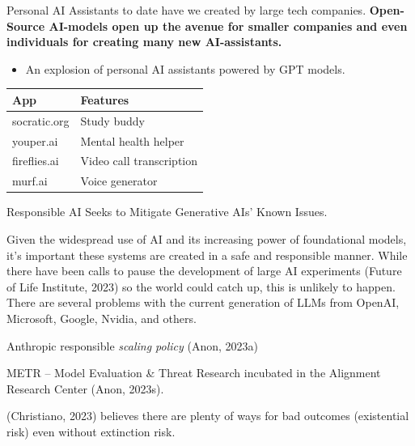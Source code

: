 \documentclass[
  letterpaper,
  DIV=11,
  numbers=noendperiod]{scrartcl}
\providecommand{\tightlist}{%
  \setlength{\itemsep}{0pt}\setlength{\parskip}{0pt}}\usepackage{longtable,booktabs,array}
\begin{document}
Personal AI Assistants to date have we created by large tech companies.
\textbf{Open-Source AI-models open up the avenue for smaller companies
and even individuals for creating many new AI-assistants.}

\begin{itemize}
\tightlist
\item
  An explosion of personal AI assistants powered by GPT models.
\end{itemize}

\begin{longtable}[]{@{}ll@{}}
\toprule\noalign{}
App & Features \\
\midrule\noalign{}
\endhead
\bottomrule\noalign{}
\endlastfoot
socratic.org & Study buddy \\
youper.ai & Mental health helper \\
fireflies.ai & Video call transcription \\
murf.ai & Voice generator \\
\end{longtable}

Responsible AI Seeks to Mitigate Generative AIs' Known Issues.

Given the widespread use of AI and its increasing power of foundational
models, it's important these systems are created in a safe and
responsible manner. While there have been calls to pause the development
of large AI experiments (Future of Life Institute, 2023) so the world
could catch up, this is unlikely to happen. There are several problems
with the current generation of LLMs from OpenAI, Microsoft, Google,
Nvidia, and others.

Anthropic responsible \emph{scaling policy} (Anon, 2023a)

METR -- Model Evaluation \& Threat Research incubated in the Alignment
Research Center (Anon, 2023s).

(Christiano, 2023) believes there are plenty of ways for bad outcomes
(existential risk) even without extinction risk.
\end{document}
